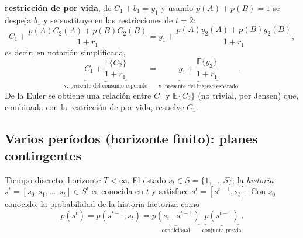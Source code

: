 \documentclass[11pt]{article}
\theoremstyle{definition}
\newcommand{\E}{\mathbb{E}}
\begin{document}
\textbf{restricción de por vida}, de $C_{1}+b_{1}=y_{1}$ y usando $p(A)+p(B)=1$ se despeja $b_{1}$ y se
sustituye en las restricciones de $t=2$:
\begin{equation}
C_{1}+\frac{p(A)C_{2}(A)+p(B)C_{2}(B)}{1+r_{1}}
=y_{1}+\frac{p(A)y_{2}(A)+p(B)y_{2}(B)}{1+r_{1}},
\end{equation}
es decir, en notación simplificada,
\begin{equation}
\underbrace{C_{1}+\frac{\E\{C_{2}\}}{1+r_{1}}}_{\text{v.\ presente del consumo esperado}}
=\underbrace{y_{1}+\frac{\E\{y_{2}\}}{1+r_{1}}}_{\text{v.\ presente del ingreso esperado}} .
\end{equation}
De la Euler se obtiene una relación entre $C_{1}$ y $\E\{C_{2}\}$ (no trivial, por Jensen) que,
combinada con la restricción de por vida, resuelve $C_{1}$.

\subsection{Varios períodos (horizonte finito): planes contingentes}

Tiempo discreto, horizonte $T<\infty$. El estado $s_{t}\in S=\{1,\dots,S\}$; la \emph{historia}
$s^{t}=[s_{0},s_{1},\dots,s_{t}]\in S^{t}$ es conocida en $t$ y satisface $s^{t}=[s^{t-1},s_{t}]$.
Con $s_{0}$ conocido, la probabilidad de la historia factoriza como
\begin{equation}
p(s^{t})=p(s^{t-1},s_{t})
=\underbrace{p(s_{t}\mid s^{t-1})}_{\text{condicional}}\;
\underbrace{p(s^{t-1})}_{\text{conjunta previa}} .
\end{equation}
\end{document}
